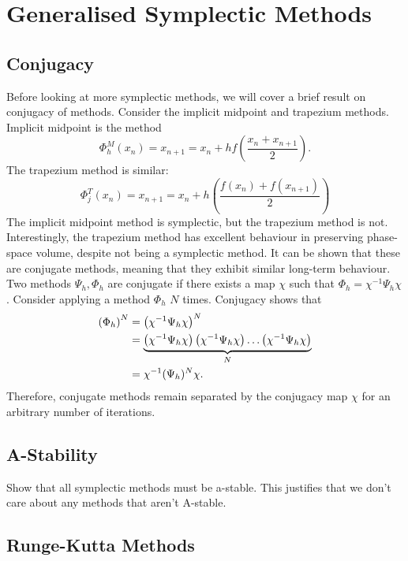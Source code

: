 \documentclass{report}
\theoremstyle{exampstyle} \newtheorem{example}[theorem]{Example}
\theoremstyle{exampstyle} \newtheorem{remark}[theorem]{Remark}
\theoremstyle{exampstyle} \newtheorem{definition}[theorem]{Definition}
\theoremstyle{exampstyle} \newtheorem{lemma}[theorem]{Lemma}
\theoremstyle{exampstyle} \newtheorem{proposition}[theorem]{Proposition}
\begin{document}
\section{Generalised Symplectic Methods}

\subsection{Conjugacy}

Before looking at more symplectic methods, we will cover a brief result on conjugacy of methods.
Consider the implicit midpoint and trapezium methods. Implicit midpoint is the method
\begin{equation*}
	\Phi_h^M (x_n) = x_{n+1} = x_n + hf\left(\frac{x_n + x_{n+1}}{2}\right).
\end{equation*}
The trapezium method is similar:
\begin{equation*}
	\Phi_j^T (x_n) = x_{n+1} = x_n + h \left(\frac{f(x_n) + f(x_{n+1})}{2}\right)
\end{equation*}
The implicit midpoint method is symplectic, but the trapezium method is not.
Interestingly, the trapezium method has excellent behaviour in preserving phase-space volume, despite not being a symplectic method.
It can be shown that these are conjugate methods, meaning that they exhibit similar long-term behaviour.
Two methods $\Psi_h, \Phi_h$ are conjugate if there exists a map $\chi$ such that $\Phi_h = \chi^{-1} \Psi_h \chi$.
Consider applying a method $\Phi_h$ $N$ times. Conjugacy shows that
\begin{align*}
	\left(\Phi_h\right)^N &= \left(\chi^{-1} \Psi_h \chi\right)^N \\
	&= \underbrace{\left(\chi^{-1} \Psi_h \chi \right)\left(\chi^{-1} \Psi_h \chi \right) \mathellipsis \left(\chi^{-1} \Psi_h \chi\right)}_{N} \\
	&= \chi^{-1} (\Psi_h)^N \chi.
\end{align*}
Therefore, conjugate methods remain separated by the conjugacy map $\chi$ for an arbitrary number of iterations.

\subsection{A-Stability}

Show that all symplectic methods must be a-stable.
This justifies that we don't care about any methods that aren't A-stable.

\subsection{Runge-Kutta Methods}
\end{document}
